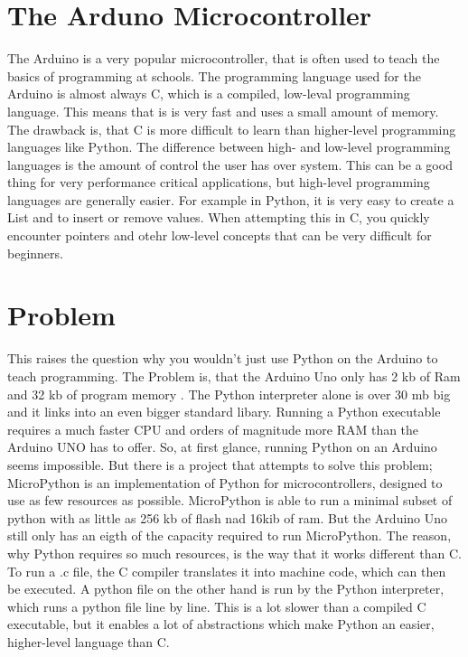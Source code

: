 \documentclass{article}
\begin{document}
\begin{multicols}{2}
\section{The Arduno Microcontroller}
The Arduino is a very popular microcontroller, that is often used to teach the basics of programming at schools. The programming language used for the Arduino is almost always C, which is a compiled, low-leval programming language. This means that is is very fast and uses a small amount of memory. The drawback is, that C is more difficult to learn than higher-level programming languages like Python. The difference between high- and low-level programming languages is the amount of control the user has over system. This can be a good thing for very performance critical applications, but high-level programming languages are generally easier. For example in Python, it is very easy to create a List and to insert or remove values. When attempting this in C, you quickly encounter pointers and otehr low-level concepts that can be very difficult for beginners.

\section{Problem}
This raises the question why you wouldn't just use Python on the Arduino to teach programming. The Problem is, that the Arduino Uno only has 2 kb of Ram and 32 kb of program memory \cite{Q1}. The Python interpreter alone is over 30 mb big and it links into an even bigger standard libary. Running a Python executable requires a much faster CPU and orders of magnitude more RAM than the Arduino UNO has to offer. So, at first glance, running Python on an Arduino seems impossible. But there is a project that attempts to solve this problem; MicroPython is an implementation of Python for microcontrollers, designed to use as few resources as possible. MicroPython is able to run a minimal subset of python with as little as 256 kb of flash nad 16kib of ram. But the Arduino Uno still only has an eigth of the capacity required to run MicroPython. The reason, why Python requires so much resources, is the way that it works different than C. To run a .c file, the C compiler translates it into machine code, which can then be executed. A python file on the other hand is run by the Python interpreter, which runs a python file line by line. This is a lot slower than a compiled C executable, but it enables a lot of abstractions which make Python an easier, higher-level language than C.


\end{multicols}
\end{document}
